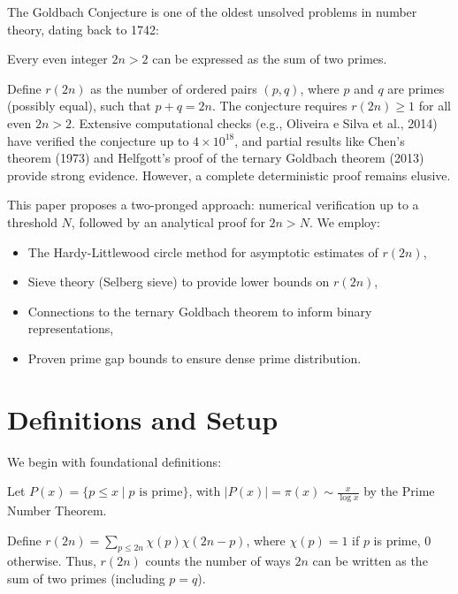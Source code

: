 \documentclass[11pt]{article}
\theoremstyle{plain}
\begin{document}
The Goldbach Conjecture is one of the oldest unsolved problems in number theory, dating back to 1742:

\begin{conjecture}
Every even integer $2n > 2$ can be expressed as the sum of two primes.
\end{conjecture}

Define $r(2n)$ as the number of ordered pairs $(p,q)$, where $p$ and $q$ are primes (possibly equal), such that $p+q=2n$. The conjecture requires $r(2n) \geq 1$ for all even $2n > 2$. Extensive computational checks (e.g., Oliveira e Silva et al., 2014) have verified the conjecture up to $4 \times 10^{18}$, and partial results like Chen’s theorem (1973) and Helfgott’s proof of the ternary Goldbach theorem (2013) provide strong evidence. However, a complete deterministic proof remains elusive.

This paper proposes a two-pronged approach: numerical verification up to a threshold $N$, followed by an analytical proof for $2n > N$. We employ:
\begin{itemize}
    \item The Hardy-Littlewood circle method for asymptotic estimates of $r(2n)$,
    \item Sieve theory (Selberg sieve) to provide lower bounds on $r(2n)$,
    \item Connections to the ternary Goldbach theorem to inform binary representations,
    \item Proven prime gap bounds to ensure dense prime distribution.
\end{itemize}

\section{Definitions and Setup}
We begin with foundational definitions:

\begin{definition}
Let $P(x) = \{ p \leq x \mid p \text{ is prime} \}$, with $|P(x)| = \pi(x) \sim \frac{x}{\log x}$ by the Prime Number Theorem.
\end{definition}

\begin{definition}
Define $r(2n) = \sum_{p \leq 2n} \chi(p) \chi(2n - p)$, where $\chi(p) = 1$ if $p$ is prime, 0 otherwise. Thus, $r(2n)$ counts the number of ways $2n$ can be written as the sum of two primes (including $p=q$).
\end{definition}
\end{document}
